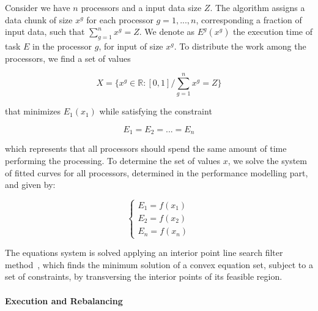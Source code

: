 \documentclass[journal]{IEEEtran}
\begin{document}
Consider we have $n$ processors and a input data size $Z$. The algorithm assigns
a data chunk of size $x^g$ for each processor $g=1,...,n$, corresponding a
fraction of input data, such that $\sum_{g=1}^n x^g = Z$. We denote as
$E^g(x^g)$ the execution time of task $E$ in the processor $g$, for input of
size $x^g$. To distribute the work among the processors, we find a set of values
	
\begin{equation}
	X = \{ x^g \in \mathbb{R}:[0,1] / \sum_{g=1}^n x^g = Z \}
	\label{eq: totalResultado}
\end{equation}

that minimizes $E_1(x_1)$ while satisfying the constraint

\begin{equation}
	E_{1} = E_{2} = ...= E_{n}
	\label{eq: Restricao}
\end{equation}

which represents that all processors should spend the same amount of time
performing the processing. To determine the set of values $x$, we solve the
system of fitted curves for all processors, determined in the performance
modelling part, and given by:

\begin{equation}
	\left\lbrace
	\begin{array}{ll}
		\displaystyle E_{1} = f(x_{1})  \\
		\displaystyle E_{2} = f(x_{2})   \\
		\displaystyle E_{n} = f(x_{n}) 
		\label{eq: system}
	\end{array}
	\right.
\end{equation}

The equations system is solved applying an interior point line search filter
method~\cite{point}, which finds the minimum solution of a convex equation set,
subject to a set of constraints, by transversing the interior points of its
feasible region.


\vspace{0.2cm}
\paragraph*{Execution and Rebalancing}  
\end{document}
